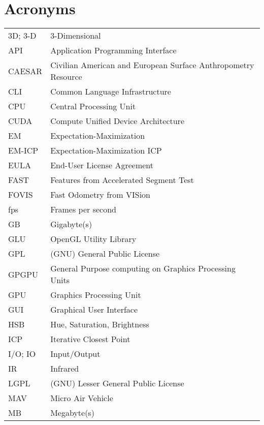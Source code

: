 \cleardoublepage
{}
{}
\chapter*{Acronyms}


\noindent
\begin{longtable}{@{}p{}p{}@{}}
    3D; 3-D & 3-Dimensional \\
        API & Application Programming Interface \\
     CAESAR & Civilian American and European Surface Anthropometry Resource \\
        CLI & Common Language Infrastructure \\
        CPU & Central Processing Unit \\
       CUDA & Compute Unified Device Architecture \\
         EM & Expectation-Maximization \\
     EM-ICP & Expectation-Maximization ICP \\
       EULA & End-User License Agreement \\
       FAST & Features from Accelerated Segment Test \\
      FOVIS & Fast Odometry from VISion \\
        fps & Frames per second \\
         GB & Gigabyte(s) \\
        GLU & OpenGL Utility Library \\
        GPL & (GNU) General Public License \\
      GPGPU & General Purpose computing on Graphics Processing Units \\
        GPU & Graphics Processing Unit \\
        GUI & Graphical User Interface \\
        HSB & Hue, Saturation, Brightness \\
        ICP & Iterative Closest Point \\
    I/O; IO & Input/Output \\
         IR & Infrared \\
       LGPL & (GNU) Lesser General Public License \\
        MAV & Micro Air Vehicle \\
         MB & Megabyte(s) \\

\end{longtable}
